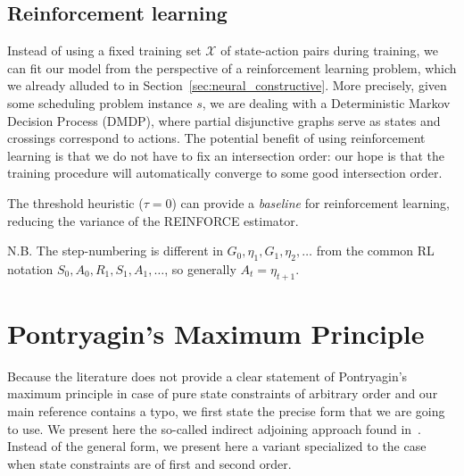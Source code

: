 \documentclass[a4paper]{article}
\theoremstyle{definition}
\theoremstyle{plain}
\begin{document}



\subsection{Reinforcement learning}

Instead of using a fixed training set $\mathcal{X}$ of state-action pairs during
training, we can fit our model from the perspective of a reinforcement learning
problem, which we already alluded to in Section~\ref{sec:neural_constructive}.
%
More precisely, given some scheduling problem instance $s$, we are dealing with
a Deterministic Markov Decision Process (DMDP), where partial disjunctive graphs
serve as states and crossings correspond to actions.
%
The potential benefit of using reinforcement learning is that we do not have to
fix an intersection order: our hope is that the training procedure will
automatically converge to some good intersection order.

{\color{Navy} The threshold heuristic ($\tau = 0$) can provide a
  \textit{baseline} for reinforcement learning, reducing the variance of the
  REINFORCE estimator.}

{\color{Navy} N.B. The step-numbering is different in
  $G_{0},\eta_{1},G_{1},\eta_{2}, \dots$ from the common RL notation
  $S_{0},A_{0},R_{1},S_{1},A_{1},\dots$, so generally $A_{t} = \eta_{t+1}$.}






\appendix

\section{Pontryagin's Maximum Principle}

Because the literature does not provide a clear statement of Pontryagin's
maximum principle in case of pure state constraints of arbitrary order and our
main reference contains a typo, we first state the precise form that we are
going to use.
%
We present here the so-called indirect adjoining approach found
in~\cite{hartlSurveyMaximumPrinciples1995}. Instead of the general form, we
present here a variant specialized to the case when state constraints are of
first and second order.
\end{document}
